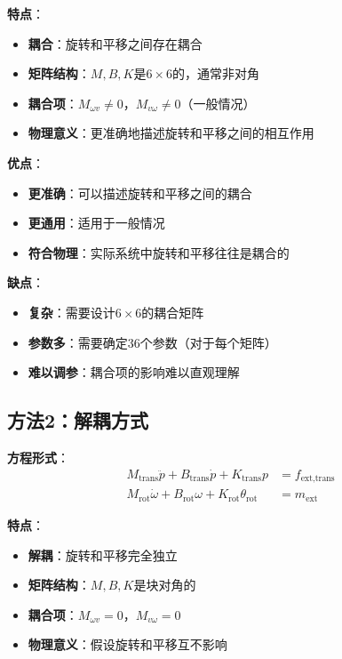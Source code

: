 \documentclass[12pt,a4paper]{article}
\begin{document}
\textbf{特点}：
\begin{itemize}
\item \textbf{耦合}：旋转和平移之间存在耦合
\item \textbf{矩阵结构}：$M, B, K$是$6 \times 6$的，通常非对角
\item \textbf{耦合项}：$M_{\omega v} \neq 0$，$M_{v\omega} \neq 0$（一般情况）
\item \textbf{物理意义}：更准确地描述旋转和平移之间的相互作用
\end{itemize}

\textbf{优点}：
\begin{itemize}
\item \textbf{更准确}：可以描述旋转和平移之间的耦合
\item \textbf{更通用}：适用于一般情况
\item \textbf{符合物理}：实际系统中旋转和平移往往是耦合的
\end{itemize}

\textbf{缺点}：
\begin{itemize}
\item \textbf{复杂}：需要设计$6 \times 6$的耦合矩阵
\item \textbf{参数多}：需要确定36个参数（对于每个矩阵）
\item \textbf{难以调参}：耦合项的影响难以直观理解
\end{itemize}

\subsection{方法2：解耦方式}

\textbf{方程形式}：
\begin{align}
M_{\text{trans}}\ddot{p} + B_{\text{trans}}\dot{p} + K_{\text{trans}}p &= f_{\text{ext,trans}} \\
M_{\text{rot}}\dot{\omega} + B_{\text{rot}}\omega + K_{\text{rot}}\theta_{\text{rot}} &= m_{\text{ext}}
\end{align}

\textbf{特点}：
\begin{itemize}
\item \textbf{解耦}：旋转和平移完全独立
\item \textbf{矩阵结构}：$M, B, K$是块对角的
\item \textbf{耦合项}：$M_{\omega v} = 0$，$M_{v\omega} = 0$
\item \textbf{物理意义}：假设旋转和平移互不影响
\end{itemize}
\end{document}
